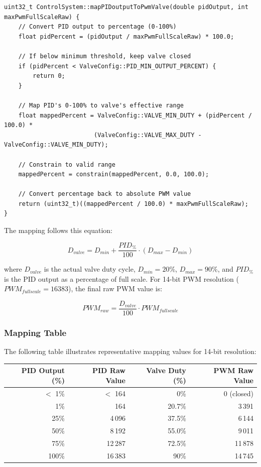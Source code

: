 \begin{lstlisting}[caption=PID Output to Valve PWM Mapping Function]
uint32_t ControlSystem::mapPIDoutputToPwmValve(double pidOutput, int maxPwmFullScaleRaw) {
    // Convert PID output to percentage (0-100%)
    float pidPercent = (pidOutput / maxPwmFullScaleRaw) * 100.0;
    
    // If below minimum threshold, keep valve closed
    if (pidPercent < ValveConfig::PID_MIN_OUTPUT_PERCENT) {
        return 0;
    }
    
    // Map PID's 0-100% to valve's effective range
    float mappedPercent = ValveConfig::VALVE_MIN_DUTY + (pidPercent / 100.0) * 
                         (ValveConfig::VALVE_MAX_DUTY - ValveConfig::VALVE_MIN_DUTY);
    
    // Constrain to valid range
    mappedPercent = constrain(mappedPercent, 0.0, 100.0);
    
    // Convert percentage back to absolute PWM value
    return (uint32_t)((mappedPercent / 100.0) * maxPwmFullScaleRaw);
}
\end{lstlisting}

The mapping follows this equation:

\begin{equation}
D_{valve} = D_{min} + \frac{PID_{\%}}{100} \cdot (D_{max} - D_{min})
\end{equation}

where $D_{valve}$ is the actual valve duty cycle, $D_{min} = 20\%$, $D_{max} = 90\%$, and $PID_{\%}$ is the PID output as a percentage of full scale. For 14-bit PWM resolution ($PWM_{fullscale} = 16383$), the final raw PWM value is:

\begin{equation}
PWM_{raw} = \frac{D_{valve}}{100} \cdot PWM_{fullscale}
\end{equation}

\subsubsection{Mapping Table}
The following table illustrates representative mapping values for 14-bit resolution:

\begin{center}
\begin{tabular}{r r r r}
\hline
\textbf{PID Output (\%)} & \textbf{PID Raw Value} & \textbf{Valve Duty (\%)} & \textbf{PWM Raw Value} \\
\hline
$<$ 1\% & $<$ 164 & 0\% & 0 (closed) \\
1\% & 164 & 20.7\% & 3\,391 \\
25\% & 4\,096 & 37.5\% & 6\,144 \\
50\% & 8\,192 & 55.0\% & 9\,011 \\
75\% & 12\,287 & 72.5\% & 11\,878 \\
100\% & 16\,383 & 90\% & 14\,745 \\
\hline
\end{tabular}
\end{center}

